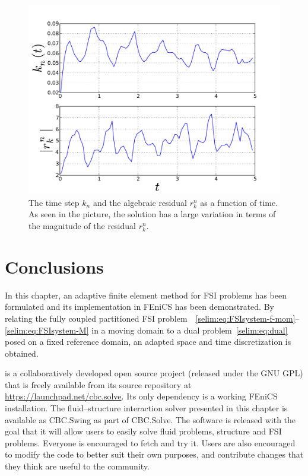 \begin{figure}
\bwfig
  \centering
  \includegraphics[width=\largefig]{chapters/selim/pdf/plot.pdf}
  \caption{The time step $k_n$ and the algebraic residual $r_k^n$ as
    a function of time. As seen in the picture, the solution has a large
    variation in terms of the magnitude of the residual $r_k^n$.}
  \label{selim:fig:cavity_timestep}
\end{figure}

\section{Conclusions}

In this chapter, an adaptive finite element method for FSI
problems has been formulated and its implementation in FEniCS has
been demonstrated. By relating the fully coupled partitioned FSI
problem~~\eqref{selim:eq:FSIsystem-f-mom}--\eqref{selim:eq:FSIsystem-M}
 in a moving domain to a dual
problem~\eqref{selim:eq:dual} posed on a fixed reference domain, an
adapted space and time discretization is obtained.


 is a collaboratively developed open source project
(released under the GNU GPL) that is freely available from its source
repository at \url{https://launchpad.net/cbc.solve}. Its only
dependency is a working FEniCS installation. The fluid--structure
interaction solver presented in this chapter is available as CBC.Swing
as part of CBC.Solve. The software is released with the goal that it
will allow users to easily solve fluid problems, structure and FSI
problems. Everyone is encouraged to fetch and try it. Users are also
encouraged to modify the code to better suit their own purposes, and
contribute changes that they think are useful to the community.
